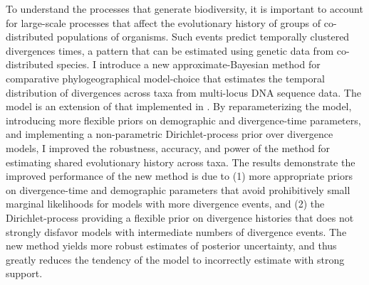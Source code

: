 To understand the processes that generate biodiversity, it is
important to account for large-scale processes that affect the evolutionary
history of groups of co-distributed populations of organisms.
Such events predict temporally clustered divergences times, a pattern
that can be estimated using genetic data from co-distributed species.
I introduce a new approximate-Bayesian method for comparative
phylogeographical model-choice that estimates the temporal distribution of
divergences across taxa from multi-locus DNA sequence data.
The model is an extension of that implemented in \msb.
By reparameterizing the model, introducing more flexible priors on
demographic and divergence-time parameters, and implementing a
non-parametric Dirichlet-process prior over divergence models, I improved
the robustness, accuracy, and power of the method for estimating shared
evolutionary history across taxa.
The results demonstrate the improved performance of the new method is due
to (1) more appropriate priors on divergence-time and demographic
parameters that avoid prohibitively small marginal likelihoods for models
with more divergence events,
and (2) the Dirichlet-process providing a flexible prior on divergence
histories that does not strongly disfavor models with intermediate numbers
of divergence events.
The new method yields more robust estimates of posterior uncertainty, and
thus greatly reduces the tendency of the model to incorrectly estimate
 with strong support.
